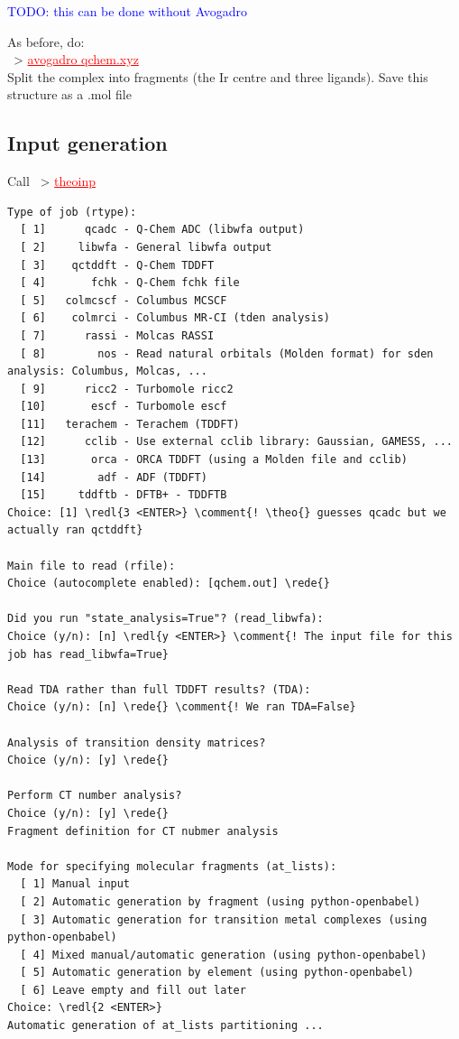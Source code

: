 \documentclass[DIV=12,headings=normal]{scrartcl}
\newcommand{\comment}[1]{\textcolor{blue}{#1}}
\newcommand{\redl}[1]{{\textcolor{red}{\underline{#1}}}}
\newcommand{\rede}[1]{\redl{#1 <ENTER>}}
\newcommand{\comm}[1]{
\small
~> \redl{#1}
\normalsize
}
\newcommand{\theo}{\textsc{TheoDORE}}
\newcounter{number}
\begin{document}
\comment{TODO: this can be done without Avogadro}

As before, do:\\
\comm{avogadro qchem.xyz}\\

Split the complex into fragments (the Ir centre and three ligands). Save this structure as a .mol file
\subsection{Input generation}
Call \comm{theoinp}
\scriptsize
\begin{Verbatim}[commandchars=\\\{\}]
Type of job (rtype):
  [ 1]      qcadc - Q-Chem ADC (libwfa output)
  [ 2]     libwfa - General libwfa output
  [ 3]    qctddft - Q-Chem TDDFT
  [ 4]       fchk - Q-Chem fchk file
  [ 5]   colmcscf - Columbus MCSCF
  [ 6]    colmrci - Columbus MR-CI (tden analysis)
  [ 7]      rassi - Molcas RASSI
  [ 8]        nos - Read natural orbitals (Molden format) for sden analysis: Columbus, Molcas, ...
  [ 9]      ricc2 - Turbomole ricc2
  [10]       escf - Turbomole escf
  [11]   terachem - Terachem (TDDFT)
  [12]      cclib - Use external cclib library: Gaussian, GAMESS, ...
  [13]       orca - ORCA TDDFT (using a Molden file and cclib)
  [14]        adf - ADF (TDDFT)
  [15]     tddftb - DFTB+ - TDDFTB
Choice: [1] \redl{3 <ENTER>} \comment{! \theo{} guesses qcadc but we actually ran qctddft}

Main file to read (rfile):
Choice (autocomplete enabled): [qchem.out] \rede{}

Did you run "state_analysis=True"? (read_libwfa):
Choice (y/n): [n] \redl{y <ENTER>} \comment{! The input file for this job has read_libwfa=True} 

Read TDA rather than full TDDFT results? (TDA):
Choice (y/n): [n] \rede{} \comment{! We ran TDA=False}

Analysis of transition density matrices?
Choice (y/n): [y] \rede{}

Perform CT number analysis?
Choice (y/n): [y] \rede{}
Fragment definition for CT nubmer analysis

Mode for specifying molecular fragments (at_lists):
  [ 1] Manual input
  [ 2] Automatic generation by fragment (using python-openbabel)
  [ 3] Automatic generation for transition metal complexes (using python-openbabel)
  [ 4] Mixed manual/automatic generation (using python-openbabel)
  [ 5] Automatic generation by element (using python-openbabel)
  [ 6] Leave empty and fill out later
Choice: \redl{2 <ENTER>}
Automatic generation of at_lists partitioning ...


\end{Verbatim}
\end{document}
